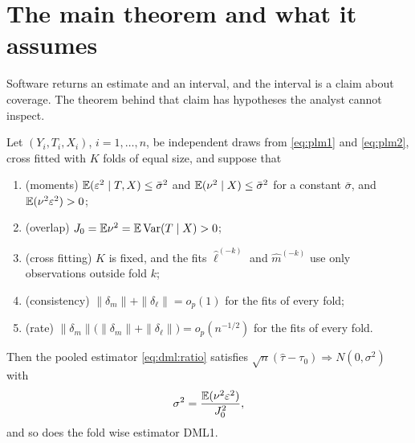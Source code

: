 \section{The main theorem and what it assumes}\label{sec:dml:thm}

Software returns an estimate and an interval, and the interval is a claim about coverage. The theorem behind that claim has hypotheses the analyst cannot inspect.

\begin{theorem}\label{dml:thm:main}
Let $(Y_i, T_i, X_i)$, $i = 1, \dots, n$, be independent draws from \eqref{eq:plm1} and \eqref{eq:plm2}, cross fitted with $K$ folds of equal size, and suppose that
\begin{enumerate}[label=(\roman*),leftmargin=*,itemsep=1pt,topsep=2pt]
\item (moments) $\mathbb{E}(\varepsilon^2 \mid T, X) \le \bar\sigma^2$ and $\mathbb{E}(\nu^2 \mid X) \le \bar\sigma^2$ for a constant $\bar\sigma$, and $\mathbb{E}(\nu^2\varepsilon^2) > 0$;
\item (overlap) $J_0 = \mathbb{E}\nu^2 = \mathbb{E}\,\mathrm{Var}(T \mid X) > 0$;
\item (cross fitting) $K$ is fixed, and the fits $\hat\ell^{(-k)}$ and $\hat m^{(-k)}$ use only observations outside fold $k$;
\item (consistency) $\|\delta_m\| + \|\delta_\ell\| = o_p(1)$ for the fits of every fold;
\item (rate) $\|\delta_m\|\bigl(\|\delta_m\| + \|\delta_\ell\|\bigr) = o_p(n^{-1/2})$ for the fits of every fold.
\end{enumerate}
Then the pooled estimator \eqref{eq:dml:ratio} satisfies $\sqrt{n}(\hat\tau - \tau_0) \Rightarrow N(0, \sigma^2)$ with
\[
\sigma^2 = \frac{\mathbb{E}(\nu^2\varepsilon^2)}{J_0^2},
\]
and so does the fold wise estimator DML1.
\end{theorem}

